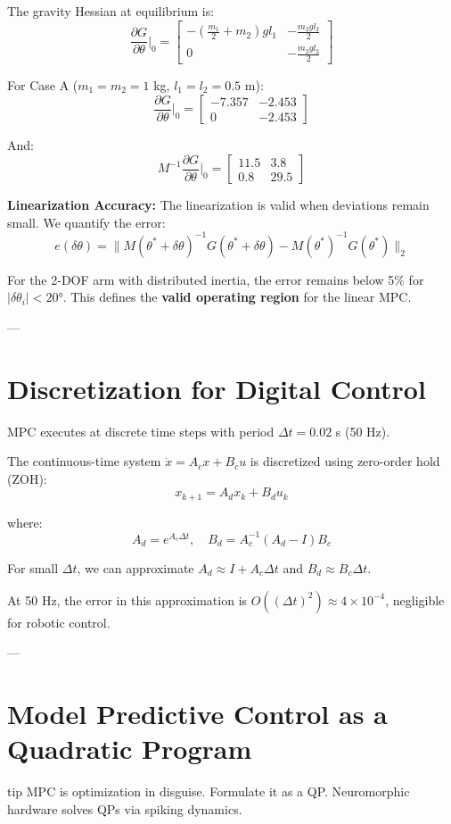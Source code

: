 The gravity Hessian at equilibrium is:
\[
\frac{\partial G}{\partial\theta}\big|_0 = \begin{bmatrix}
-\left(\frac{m_1}{2} + m_2\right) g l_1 & -\frac{m_2 g l_2}{2} \\
0 & -\frac{m_2 g l_2}{2}
\end{bmatrix}
\]

For Case A ($m_1 = m_2 = 1$ kg, $l_1 = l_2 = 0.5$ m):
\[
\frac{\partial G}{\partial\theta}\big|_0 = \begin{bmatrix} -7.357 & -2.453 \\ 0 & -2.453 \end{bmatrix}
\]

And:
\[
M^{-1} \frac{\partial G}{\partial\theta}\big|_0 = \begin{bmatrix} 11.5 & 3.8 \\ 0.8 & 29.5 \end{bmatrix}
\]

\textbf{Linearization Accuracy:} The linearization is valid when deviations remain small. We quantify the error:
\[
e(\delta\theta) = \|M(\theta^* + \delta\theta)^{-1} G(\theta^* + \delta\theta) - M(\theta^*)^{-1} G(\theta^*)\|_2
\]

For the 2-DOF arm with distributed inertia, the error remains below 5\% for $|\delta\theta_i| < 20°$. This defines the \textbf{valid operating region} for the linear MPC.

---

\section{Discretization for Digital Control}

MPC executes at discrete time steps with period $\Delta t = 0.02$ s (50 Hz).

The continuous-time system $\dot{x} = A_c x + B_c u$ is discretized using zero-order hold (ZOH):
\[
x_{k+1} = A_d x_k + B_d u_k
\]

where:
\[
A_d = e^{A_c \Delta t}, \quad B_d = A_c^{-1} (A_d - I) B_c
\]

For small $\Delta t$, we can approximate $A_d \approx I + A_c \Delta t$ and $B_d \approx B_c \Delta t$.

At 50 Hz, the error in this approximation is $O((\Delta t)^2) \approx 4 \times 10^{-4}$, negligible for robotic control.

---

\section{Model Predictive Control as a Quadratic Program}
\begin{block}{tip}
MPC is optimization in disguise. Formulate it as a QP. Neuromorphic hardware solves QPs via spiking dynamics.
\end{block}

